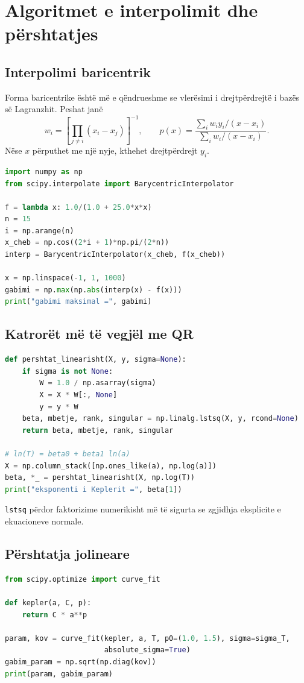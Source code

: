 \documentclass[11pt,oneside,openany]{book}
\begin{document}
\section{Algoritmet e interpolimit dhe përshtatjes}
\subsection{Interpolimi baricentrik}
Forma baricentrike është më e qëndrueshme se vlerësimi i drejtpërdrejtë i bazës së Lagranzhit. Peshat janë
\begin{equation}
 w_i=\left[\prod_{j\ne i}(x_i-x_j)\right]^{-1},\qquad
 p(x)=\frac{\sum_iw_iy_i/(x-x_i)}{\sum_iw_i/(x-x_i)}.
\end{equation}
Nëse $x$ përputhet me një nyje, kthehet drejtpërdrejt $y_i$.

\begin{lstlisting}[language=Python,caption={Interpolimi baricentrik nga SciPy.}]
import numpy as np
from scipy.interpolate import BarycentricInterpolator

f = lambda x: 1.0/(1.0 + 25.0*x*x)
n = 15
i = np.arange(n)
x_cheb = np.cos((2*i + 1)*np.pi/(2*n))
interp = BarycentricInterpolator(x_cheb, f(x_cheb))

x = np.linspace(-1, 1, 1000)
gabimi = np.max(np.abs(interp(x) - f(x)))
print("gabimi maksimal =", gabimi)
\end{lstlisting}

\subsection{Katrorët më të vegjël me QR}
\begin{lstlisting}[language=Python,caption={Përshtatja e një modeli linear në parametra.}]
def pershtat_linearisht(X, y, sigma=None):
    if sigma is not None:
        W = 1.0 / np.asarray(sigma)
        X = X * W[:, None]
        y = y * W
    beta, mbetje, rank, singular = np.linalg.lstsq(X, y, rcond=None)
    return beta, mbetje, rank, singular

# ln(T) = beta0 + beta1 ln(a)
X = np.column_stack([np.ones_like(a), np.log(a)])
beta, *_ = pershtat_linearisht(X, np.log(T))
print("eksponenti i Keplerit =", beta[1])
\end{lstlisting}
\texttt{lstsq} përdor faktorizime numerikisht më të sigurta se zgjidhja eksplicite e ekuacioneve normale.

\subsection{Përshtatja jolineare}
\begin{lstlisting}[language=Python,caption={Përshtatja e modelit $T=C a^p$ në shkallën origjinale.}]
from scipy.optimize import curve_fit

def kepler(a, C, p):
    return C * a**p

param, kov = curve_fit(kepler, a, T, p0=(1.0, 1.5), sigma=sigma_T,
                       absolute_sigma=True)
gabim_param = np.sqrt(np.diag(kov))
print(param, gabim_param)
\end{lstlisting}
\end{document}
